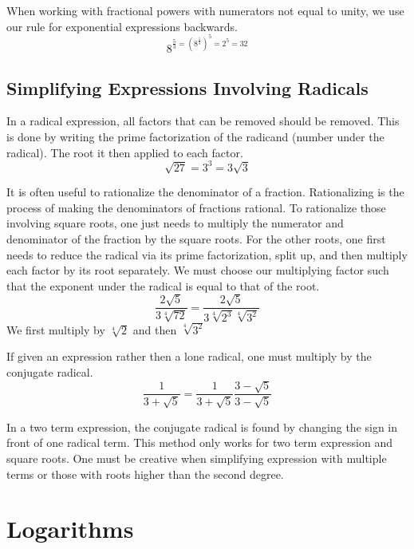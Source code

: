 When working with fractional powers with numerators not equal to unity, we use our rule for exponential expressions backwards. $$ 8^{\frac{5}{3} = (8^{\frac{1}{3}})^5 = 2^5 = 32} $$

\subsection*{Simplifying Expressions Involving Radicals}

In a radical expression, all factors that can be removed should be removed. This is done by writing the prime factorization of the radicand (number under the radical). The root it then applied to each factor. $$ \sqrt{27} = 3^3 = 3 \sqrt{3}$$

It is often useful to rationalize the denominator of a fraction. Rationalizing is the process of making the denominators of fractions rational. To rationalize those involving square roots, one just needs to multiply the numerator and denominator of the fraction by the square roots. For the other roots, one first needs to reduce the radical via its prime factorization, split up, and then multiply each factor by its root separately. We must choose our multiplying factor such that the exponent under the radical is equal to that of the root. $$ \frac{2 \sqrt{5}}{3 \sqrt[4]{72}} = \frac{2 \sqrt{5}}{3 \sqrt[4]{2^3} \sqrt[4]{3^2}} $$ We first multiply by $ \sqrt[4]{2}$ and then $\sqrt[4]{3^2}$

If given an expression rather then a lone radical, one must multiply by the conjugate radical. $$\frac{1}{3 + \sqrt{5}} = \frac{1}{3 + \sqrt{5}} \frac{3 - \sqrt{5}}{3 - \sqrt{5}}$$

In a two term expression, the conjugate radical is found by changing the sign in front of one radical term. This method only works for two term expression and square roots. One must be creative when simplifying expression with multiple terms or those with roots higher than the second degree.

\section*{Logarithms}


